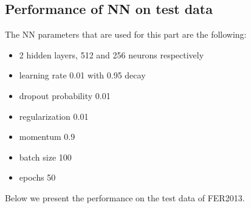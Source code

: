 \documentclass[12pt,twoside]{article}
\begin{document}
\subsection{Performance of NN on test data}

The NN parameters that are used for this part are the following:
\begin{itemize}
\item 2 hidden layers, 512 and 256 neurons respectively
\item learning rate 0.01 with 0.95 decay
\item dropout probability 0.01
\item regularization 0.01
\item momentum 0.9
\item batch size 100
\item epochs 50
\end{itemize}
Below we present the performance on the test data of FER2013.
\end{document}
